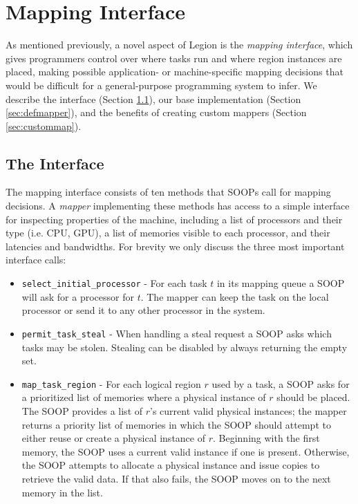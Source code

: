 \section{Mapping Interface}
\label{sec:mapping}

As mentioned previously, a novel aspect of Legion is the {\em mapping interface},
which gives programmers control over where tasks run and where region instances are placed,
making possible application- or machine-specific mapping decisions that would be difficult for a 
general-purpose programming system to infer.
We describe the interface (Section \ref{sec:mapinterface}),
our base implementation (Section \ref{sec:defmapper}), and the benefits
of creating custom mappers (Section \ref{sec:custommap}).

\subsection{The Interface}
\label{sec:mapinterface}

The mapping interface consists of ten methods that SOOPs call for
mapping decisions.  A {\em mapper} implementing these methods has access to a simple interface
for inspecting properties of the machine, including a list of
processors and their type (i.e. CPU, GPU), a list of
memories visible to each processor, and their latencies and bandwidths.
For brevity we only discuss the three most important interface calls:

\begin{itemize}
\item {\tt select\_initial\_processor} - For each task $t$ in its mapping queue a SOOP will
ask for a processor for $t$.  The mapper can keep the task on the local processor or send it to 
any other processor in the system.

\item {\tt permit\_task\_steal} - When handling a steal request a SOOP
asks which tasks may be stolen.  Stealing can be disabled by always returning the empty set.

\item {\tt map\_task\_region} - For each logical region $r$ used by a task, a
SOOP asks for a prioritized list of memories where a physical instance of $r$ should be placed.  
The SOOP provides a list of $r$'s current valid physical instances;
the mapper returns a priority list of memories in which the SOOP
should attempt to either reuse or create a physical instance of $r$.  Beginning with
the first memory, the SOOP uses a current valid instance if one is present.  Otherwise,
the SOOP attempts to allocate a physical instance and issue copies
to retrieve the valid data.  If that also fails, the SOOP moves on to the next memory in the list.
\end{itemize}

